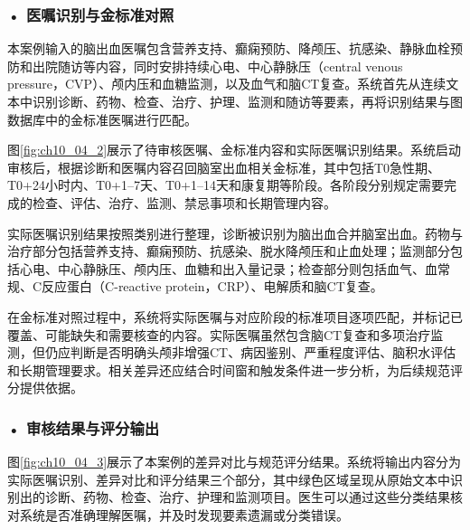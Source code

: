 \subsubsection*{\textbf{• 医嘱识别与金标准对照}}

本案例输入的脑出血医嘱包含营养支持、癫痫预防、降颅压、抗感染、静脉血栓预防和出院随访等内容，同时安排持续心电、中心静脉压（central venous pressure，CVP）、颅内压和血糖监测，以及血气和脑CT复查。系统首先从连续文本中识别诊断、药物、检查、治疗、护理、监测和随访等要素，再将识别结果与图数据库中的金标准医嘱进行匹配。

图\ref{fig:ch10_04_2}展示了待审核医嘱、金标准内容和实际医嘱识别结果。系统启动审核后，根据诊断和医嘱内容召回脑室出血相关金标准，其中包括T0急性期、T0+24小时内、T0+1--7天、T0+1--14天和康复期等阶段。各阶段分别规定需要完成的检查、评估、治疗、监测、禁忌事项和长期管理内容。

实际医嘱识别结果按照类别进行整理，诊断被识别为脑出血合并脑室出血。药物与治疗部分包括营养支持、癫痫预防、抗感染、脱水降颅压和止血处理；监测部分包括心电、中心静脉压、颅内压、血糖和出入量记录；检查部分则包括血气、血常规、C反应蛋白（C-reactive protein，CRP）、电解质和脑CT复查。

在金标准对照过程中，系统将实际医嘱与对应阶段的标准项目逐项匹配，并标记已覆盖、可能缺失和需要核查的内容。实际医嘱虽然包含脑CT复查和多项治疗监测，但仍应判断是否明确头颅非增强CT、病因鉴别、严重程度评估、脑积水评估和长期管理要求。相关差异还应结合时间窗和触发条件进一步分析，为后续规范评分提供依据。


\par
\noindent\begin{minipage}{\textwidth}
\centering
{}
\begingroup
\renewcommand{\thefigure}{10.4-2}
\label{fig:ch10_04_2}
\addtocounter{figure}{-1}
\endgroup
\end{minipage}
\par

\subsubsection*{\textbf{• 审核结果与评分输出}}

图\ref{fig:ch10_04_3}展示了本案例的差异对比与规范评分结果。系统将输出内容分为实际医嘱识别、差异对比和评分结果三个部分，其中绿色区域呈现从原始文本中识别出的诊断、药物、检查、治疗、护理和监测项目。医生可以通过这些分类结果核对系统是否准确理解医嘱，并及时发现要素遗漏或分类错误。

